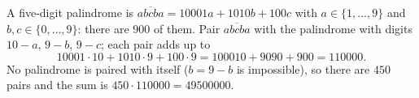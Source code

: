 A five-digit palindrome is $\overline{abcba}=10001a+1010b+100c$ with $a\in\{1,\dots,9\}$ and $b,c\in\{0,\dots,9\}$: there are $900$ of them. Pair $\overline{abcba}$ with the palindrome with digits $10-a$, $9-b$, $9-c$; each pair adds up to
\[10001\cdot10+1010\cdot9+100\cdot9=100010+9090+900=110000.\]
No palindrome is paired with itself ($b=9-b$ is impossible), so there are $450$ pairs and the sum is $450\cdot110000=\boxed{49500000}$.
